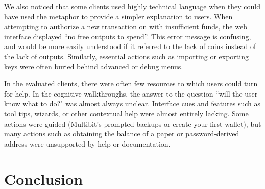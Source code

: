 We also noticed that some clients used highly technical language when they could have used the metaphor to provide a simpler explanation to users. When attempting to authorize a new transaction on \block with insufficient funds, the web interface displayed ``no free outputs to spend''. This error message is confusing, and would be more easily understood if it referred to the lack of coins instead of the lack of outputs. Similarly, essential actions such as importing or exporting keys were often buried behind advanced or debug menus. 





In the evaluated clients, there were often few resources to which users could turn for help. In the cognitive walkthroughs, the answer to the question ``will the user know what to do?" was almost always unclear. Interface cues and features such as tool tips, wizards, or other contextual help were almost entirely lacking. Some actions were guided (\eg Multibit's prompted backups or create your first wallet), but many actions such as obtaining the balance of a paper or password-derived address were unsupported by help or documentation.  



\section{Conclusion}

